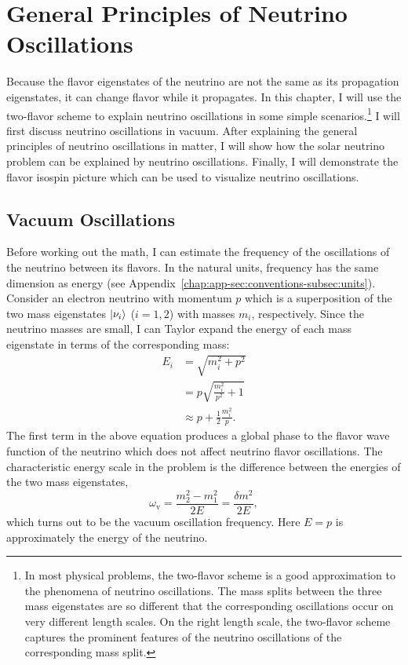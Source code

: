 

\chapter{\label{chap:basics}General Principles of Neutrino Oscillations}

Because the flavor eigenstates of the neutrino are not the same as its propagation eigenstates, it can change flavor while it propagates.
In this chapter, I will use the two-flavor scheme to explain neutrino oscillations in some simple scenarios.\footnote{In most physical problems, the two-flavor scheme is a good approximation to the phenomena of neutrino oscillations. The mass splits between the three mass eigenstates are so different that the corresponding oscillations occur on very different length scales. On the right length scale, the two-flavor scheme captures the prominent features of the neutrino oscillations of the corresponding mass split.}
I will first discuss neutrino oscillations in vacuum. After explaining the general principles of neutrino oscillations in matter, I will show how the solar neutrino problem can be explained by neutrino oscillations. Finally, I will demonstrate the flavor isospin picture which can be used to visualize neutrino oscillations.


\section{\label{chap:basics-sec:vacuum-oscillations}Vacuum Oscillations}

Before working out the math, I can estimate the frequency of the oscillations of the neutrino between its flavors. In the natural units, frequency has the same dimension as energy (see Appendix~\ref{chap:app-sec:conventions-subsec:units}). Consider an electron neutrino with momentum $p$ which is a superposition of the two mass eigenstates $\left| \nu_i\right\rangle$ ($i=1,2$) with masses $m_i$, respectively. Since the neutrino masses are small, I can Taylor expand the energy of each mass eigenstate in terms of the corresponding mass:
\begin{align}
E_i & = \sqrt{m_i^2 + p^2 } \nonumber\\
& = p \sqrt{\frac{m_i^2}{p^2} + 1} \nonumber\\
& \approx p + \frac{1}{2} \frac{m_i^2}{p}.
\label{chap:basics-section:neutrinos-eqn:energy-taylor}
\end{align}
The first term in the above equation produces a global phase to the flavor wave function of the neutrino which does not affect neutrino flavor oscillations. The characteristic energy scale in the problem is the difference between the energies of the two mass eigenstates,
\begin{equation}
    \omega_{\mathrm v} =  \frac{m_2^2-m_1^2}{2E} = \frac{\delta m^2}{2E},
    \label{chap:basics-section:neutrinos-eqn:qualitative-method-frequency}
\end{equation}
which turns out to be the vacuum oscillation frequency. Here $E=p$ is approximately the energy of the neutrino.

